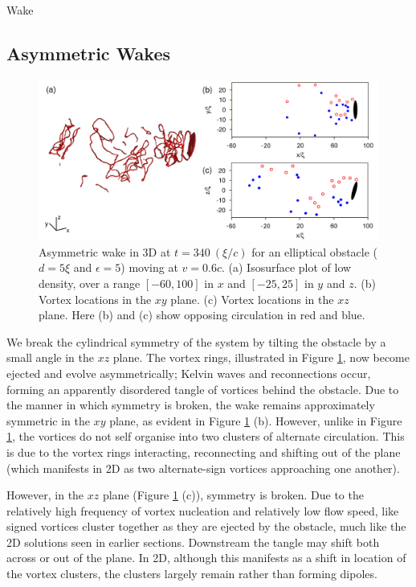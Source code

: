 \begin{chapter}{\label{cha:wake}Wake}
\subsection{Asymmetric Wakes}
\begin{figure}
\centering
\includegraphics[width=\textwidth]{wake/figure8}
\caption{\label{fig:3d4} Asymmetric wake in 3D at $t=340~(\xi/c)$ for an elliptical obstacle ($d=5\xi$ and $\epsilon=5$) moving at $v=0.6c$. (a) Isosurface plot of low density, over a range $[-60,100]$ in $x$ and $[-25,25]$ in $y$ and $z$. (b) Vortex locations in the $xy$ plane.  (c) Vortex locations in the $xz$ plane.  Here (b) and (c) show opposing circulation in red and blue.}
\end{figure}

We break the cylindrical symmetry of the system by tilting the obstacle by a small angle in the $xz$ plane.  The vortex rings, illustrated in Figure \ref{fig:3d4}, now become ejected and evolve asymmetrically; Kelvin waves and reconnections occur, forming an apparently disordered tangle of vortices behind the obstacle.  Due to the manner in which symmetry is broken, the wake remains approximately symmetric in the $xy$ plane, as evident in Figure \ref{fig:3d4} (b).  However, unlike in Figure \ref{fig:3d4}, the vortices do not self organise into two clusters of alternate circulation. This is due to the vortex rings interacting, reconnecting and shifting out of the plane (which manifests in 2D as two alternate-sign vortices approaching one another).




However, in the $xz$ plane (Figure \ref{fig:3d4} (c)), symmetry is broken. Due to the relatively high frequency of vortex nucleation and relatively low flow speed, like signed vortices cluster together as they are ejected by the obstacle, much like the 2D solutions seen in earlier sections.  Downstream the tangle may shift both across or out of the plane. In 2D, although this manifests as a shift in location of the vortex clusters, the clusters largely remain rather than forming dipoles. 


\end{chapter}
